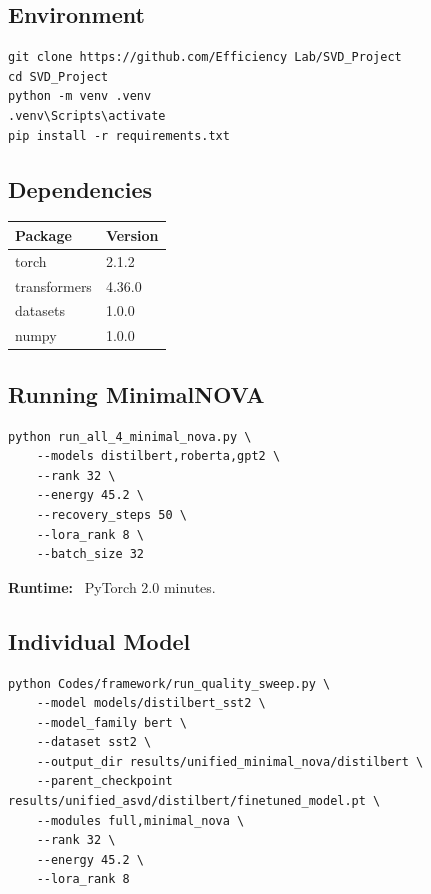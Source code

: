 \subsection{Environment}

\begin{lstlisting}
git clone https://github.com/Efficiency Lab/SVD_Project
cd SVD_Project
python -m venv .venv
.venv\Scripts\activate
pip install -r requirements.txt
\end{lstlisting}

\subsection{Dependencies}

\begin{table}[H]
\centering
\small
\begin{tabular}{ll}
\toprule
\textbf{Package} & \textbf{Version} \\
\midrule
torch & 2.1.2 \\
transformers & 4.36.0 \\
datasets & 1.0.0 \\
numpy & 1.0.0 \\
\bottomrule
\end{tabular}
\end{table}

\subsection{Running MinimalNOVA}

\begin{lstlisting}
python run_all_4_minimal_nova.py \
    --models distilbert,roberta,gpt2 \
    --rank 32 \
    --energy 45.2 \
    --recovery_steps 50 \
    --lora_rank 8 \
    --batch_size 32
\end{lstlisting}

\textbf{Runtime:} ~PyTorch 2.0 minutes.

\subsection{Individual Model}

\begin{lstlisting}
python Codes/framework/run_quality_sweep.py \
    --model models/distilbert_sst2 \
    --model_family bert \
    --dataset sst2 \
    --output_dir results/unified_minimal_nova/distilbert \
    --parent_checkpoint results/unified_asvd/distilbert/finetuned_model.pt \
    --modules full,minimal_nova \
    --rank 32 \
    --energy 45.2 \
    --lora_rank 8
\end{lstlisting}

